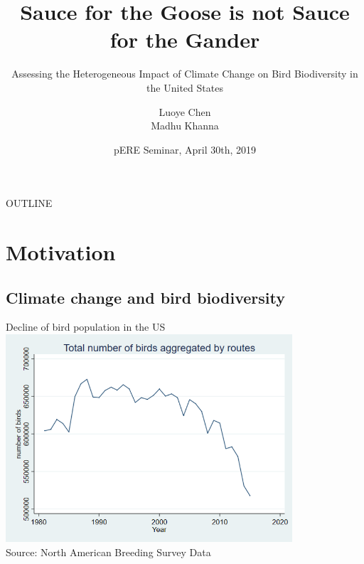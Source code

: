 \documentclass[handout]{beamer}
\title[Sauce for the Goose is not Sauce for the Gander] %
{Sauce for the Goose is not Sauce for the Gander}
\subtitle
{Assessing the Heterogeneous Impact of Climate Change on Bird Biodiversity in the United States}
\author[Luoye Chen] %
{Luoye Chen\\ Madhu Khanna\inst{1}}
\institute[UIUC-ACE] %
{
  \inst{1}%
  Department of Agricultural and Consumer Economics\\
  University of Illinois
}
\date[pERE 2018] %
{pERE Seminar, April 30th, 2019}
\begin{document}
\begin{frame}
  \titlepage
\end{frame}

\begin{frame}{OUTLINE}
  \tableofcontents
\end{frame}





\section{Motivation}

\subsection{Climate change and bird biodiversity}

\begin{frame}{Decline of bird population in the US}
  \includegraphics[width=0.8\textwidth]{bird-1.png}\\
  {\footnotesize  Source: North American Breeding Survey Data}
\end{frame}
\end{document}
